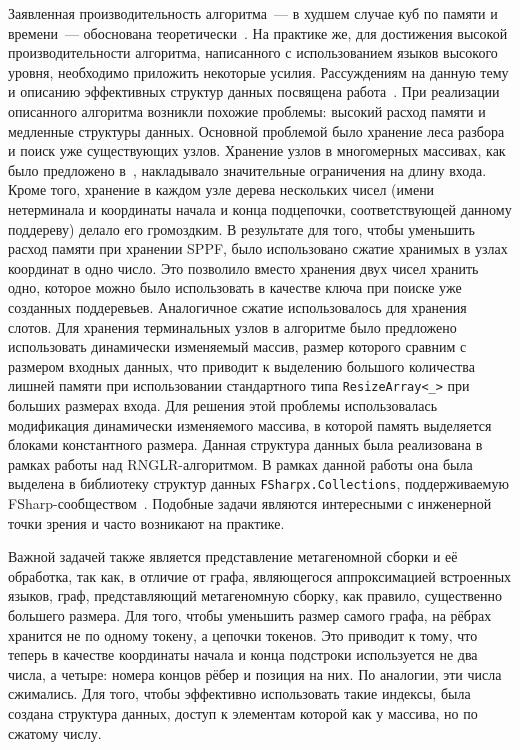 Заявленная производительность алгоритма~--- в худшем случае куб по памяти и времени~--- обоснована теоретически~\cite{Johnstone201564}. На практике же, для достижения высокой производительности алгоритма, написанного с использованием языков высокого уровня, необходимо приложить некоторые усилия. Рассуждениям на данную тему и описанию эффективных структур данных посвящена работа~\cite{Johnstone2011}. При реализации описанного алгоритма возникли похожие проблемы: высокий расход памяти и медленные структуры данных. Основной проблемой было хранение леса разбора и поиск уже существующих узлов. Хранение узлов в многомерных массивах, как было предложено в~\cite{Johnstone2011}, накладывало значительные ограничения на длину входа. Кроме того, хранение в каждом узле дерева нескольких чисел (имени нетерминала и координаты начала и конца подцепочки, соответствующей данному поддереву) делало его громоздким. В результате для того, чтобы уменьшить расход памяти при хранении SPPF, было использовано сжатие хранимых в узлах координат в одно число. Это позволило вместо хранения двух чисел хранить одно, которое можно было использовать в качестве ключа при поиске уже созданных поддеревьев. Аналогичное сжатие использовалось для хранения слотов. Для хранения терминальных узлов в алгоритме было предложено использовать динамически изменяемый массив,  размер которого сравним с размером входных данных, что приводит к выделению большого количества лишней памяти при использовании стандартного типа \verb|ResizeArray<_>| при больших размерах входа. Для решения этой проблемы использовалась модификация динамически изменяемого массива, в которой память выделяется блоками константного размера. Данная структура данных была реализована в рамках работы над RNGLR-алгоритмом. В рамках данной работы она была выделена в библиотеку структур данных \texttt{FSharpx.Collections}, поддерживаемую FSharp-сообществом~\cite{FsharpX}. Подобные задачи являются интересными с инженерной точки зрения и часто возникают на практике.

Важной задачей также является представление метагеномной сборки и её обработка, так как, в отличие от графа, являющегося аппроксимацией встроенных языков, граф, представляющий метагеномную сборку, как правило, существенно большего размера. Для того, чтобы уменьшить размер самого графа, на рёбрах хранится не по одному токену, а цепочки токенов. Это приводит к тому, что теперь в качестве координаты начала и конца подстроки используется не два числа, а четыре: номера концов рёбер и позиция на них. По аналогии, эти числа сжимались. Для того, чтобы эффективно использовать такие индексы, была создана структура данных, доступ к элементам которой как у массива, но по сжатому числу. 

